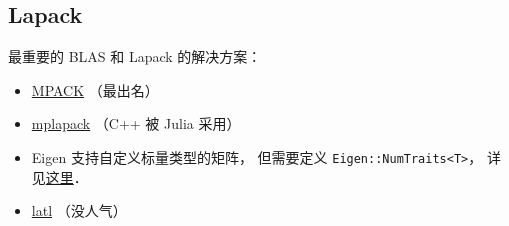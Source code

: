 \subsection{Lapack}
最重要的 BLAS 和 Lapack 的解决方案：
\begin{itemize}
\item \href{http://mplapack.sourceforge.net/}{MPACK} （最出名）
\item \href{https://github.com/nakatamaho/mplapack}{mplapack} （C++ 被 Julia 采用）
\item Eigen 支持自定义标量类型的矩阵， 但需要定义 \verb|Eigen::NumTraits<T>|， 详见\href{https://eigen.tuxfamily.org/dox/TopicCustomizing_CustomScalar.html}{这里}．
\item \href{https://github.com/langou/latl}{latl} （没人气）
\end{itemize}
